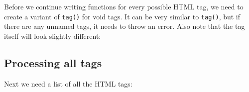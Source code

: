 Before we continue writing functions for every possible HTML tag, we
need to create a variant of \texttt{tag()} for void tags. It can be very
similar to \texttt{tag()}, but if there are any unnamed tags, it needs
to throw an error. Also note that the tag itself will look slightly
different:

\begin{Shaded}
\begin{Highlighting}[]
\StringTok{ }
    \StringTok{ }
    \NormalTok{(}\StringTok{ }\NormalTok{) \{}
      \NormalTok{(}\NormalTok{, } \NormalTok{)}
    \NormalTok{\}}
    \StringTok{ }\NormalTok{(}

    \NormalTok{(}\NormalTok{(}\NormalTok{))}
  \NormalTok{\}}
\NormalTok{\}}

\StringTok{ }\NormalTok{(}\NormalTok{)}
\NormalTok{(} \NormalTok{, } \NormalTok{, } \NormalTok{)}
\end{Highlighting}
\end{Shaded}

\subsection{Processing all tags}

Next we need a list of all the HTML tags:

